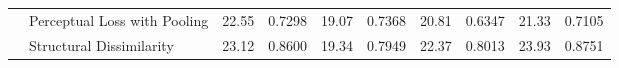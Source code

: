 \begin{table*}[tbh]
\begin{tabular}{ll cc cc cc cc}
                                           & Perceptual Loss with Pooling              & 22.55                                    & 0.7298                               & 19.07                                     & 0.7368                                        & 20.81          & 0.6347          & 21.33          & 0.7105          \\
                                           & Structural Dissimilarity                  & 23.12                                    & 0.8600                               & 19.34                                     & 0.7949                                        & 22.37          & 0.8013          & 23.93          & 0.8751          \\
        \bottomrule
    \end{tabular}
\end{table*}